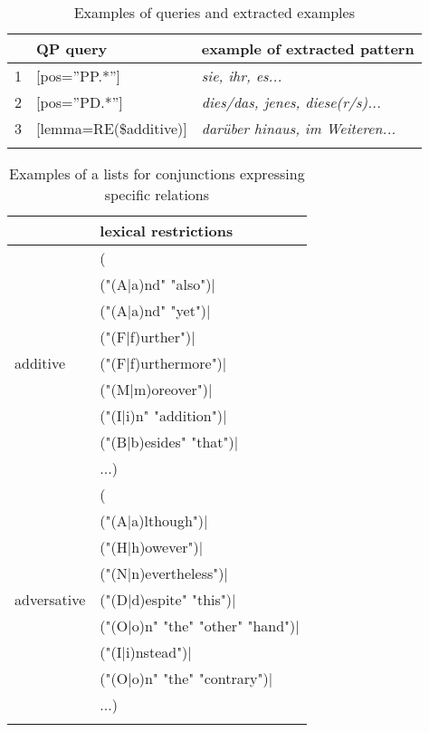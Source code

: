 \documentclass[output=paper]{langsci/langscibook.cls}
\begin{document}
\begin{table} 
	
	 
	\begin{tabularx}{\textwidth}{llX}
		\lsptoprule
		& {\bf QP query} & {\bf example of extracted pattern}\\
		\midrule
		1& [pos=''PP.*''] &   \textsl{sie, ihr, es...}\\ 
	     2&[pos=''PD.*''] &   \textsl{dies/das, jenes, diese(r/s)...}\\
		 
				3  & [lemma=RE(\$additive)]&  \textsl{dar\"uber hinaus, im Weiteren...} \\
				\lspbottomrule
	\end{tabularx}
	\caption{Examples of queries and extracted examples}
	\label{Table:queries1}
\end{table}

\begin{table} 
	
	
	\begin{tabular}{ll}
		\lsptoprule
		&\bf	lexical restrictions \\
		\midrule
		&(\\
		&("(A$|$a)nd" "also")$|$\\
		&("(A$|$a)nd" "yet")$|$\\
		&("(F$|$f)urther")$|$\\
		additive&("(F$|$f)urthermore")$|$\\
		&("(M$|$m)oreover")$|$\\
		&("(I$|$i)n" "addition")$|$\\
		&("(B$|$b)esides" "that")$|$\\
		&...)\\
		\midrule
		&(\\
		&	("(A$|$a)lthough")$|$\\
		&	("(H$|$h)owever")$|$\\
		&	("(N$|$n)evertheless")$|$\\
		adversative	&	("(D$|$d)espite" "this")$|$\\
		&	("(O$|$o)n" "the" "other" "hand")$|$\\
		&	("(I$|$i)nstead")$|$\\
		&	("(O$|$o)n" "the" "contrary")$|$\\
		&...)\\
		\lspbottomrule
	\end{tabular}
	\caption{Examples of a lists for conjunctions expressing specific relations}
	\label{Table:conjlist}
\end{table}
\end{document}
